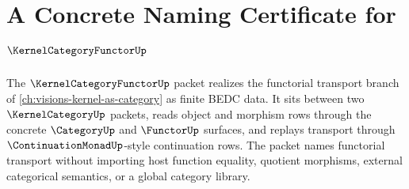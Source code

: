 \chapter{A Concrete Naming Certificate for $\KernelCategoryFunctorUp$}
\label{ch:concrete-instances-kernel-category-functor-namecert}

The $\KernelCategoryFunctorUp$ packet realizes the functorial transport branch of \autoref{ch:visions-kernel-as-category} as finite BEDC data. It sits between two $\KernelCategoryUp$ packets, reads object and morphism rows through the concrete $\CategoryUp$ and $\FunctorUp$ surfaces, and replays transport through $\ContinuationMonadUp$-style continuation rows. The packet names functorial transport without importing host function equality, quotient morphisms, external categorical semantics, or a global category library.

